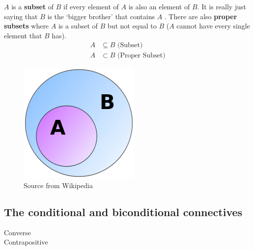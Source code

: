 \documentclass[../setup.tex]{subfiles}
\begin{document}
\begin{theorem}[Subset]
$A$ is a \textbf{subset} of $B$ if every element of $A$ is also an element of $B$. It is really just saying that $B$ is the `bigger brother' that contains $A$ . There are also \textbf{proper subsets} where $A$ is a subset of $B$ but not equal to $B$ ($A$ cannot have every single element that $B$ has).
\begin{align*}
A &\subseteq B \text{\ \ \ \ (Subset)} \\
A &\subset B \text{\ \ \ \ (Proper Subset)}
\end{align*}
\begin{figure}[H]
    \centering
    \includegraphics[scale=0.6]{Venn Diagram-ProperSubset.png}
    \caption{Source from Wikipedia}
\end{figure}
\end{theorem}

\subsection{The conditional and biconditional connectives}
\begin{theorem}
\end{theorem}
Converse \\
Contrapositive 

\begin{theorem}
\end{theorem}
\end{document}
